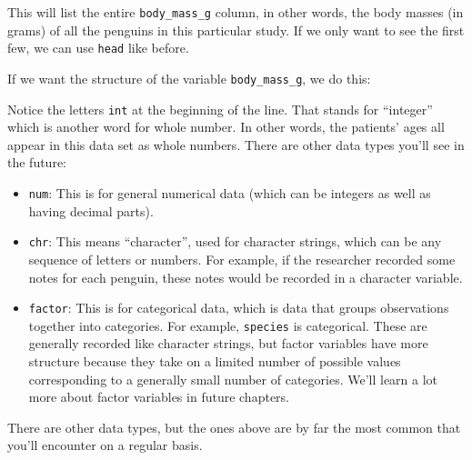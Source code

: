 \documentclass[
]{book}
\newenvironment{Shaded}{\begin{snugshade}}{\end{snugshade}}
\newcommand{\FunctionTok}[1]{\textcolor[rgb]{0.00,0.00,0.00}{#1}}
\newcommand{\NormalTok}[1]{#1}
\newcommand{\SpecialCharTok}[1]{\textcolor[rgb]{0.00,0.00,0.00}{#1}}
\providecommand{\tightlist}{%
  \setlength{\itemsep}{0pt}\setlength{\parskip}{0pt}}
\begin{document}
This will list the entire \texttt{body\_mass\_g} column, in other words, the body masses (in grams) of all the penguins in this particular study. If we only want to see the first few, we can use \texttt{head} like before.

\begin{Shaded}
\end{Shaded}

If we want the structure of the variable \texttt{body\_mass\_g}, we do this:

\begin{Shaded}
\end{Shaded}

Notice the letters \texttt{int} at the beginning of the line. That stands for ``integer'' which is another word for whole number. In other words, the patients' ages all appear in this data set as whole numbers. There are other data types you'll see in the future:

\begin{itemize}
\tightlist
\item
  \texttt{num}: This is for general numerical data (which can be integers as well as having decimal parts).
\item
  \texttt{chr}: This means ``character'', used for character strings, which can be any sequence of letters or numbers. For example, if the researcher recorded some notes for each penguin, these notes would be recorded in a character variable.
\item
  \texttt{factor}: This is for categorical data, which is data that groups observations together into categories. For example, \texttt{species} is categorical. These are generally recorded like character strings, but factor variables have more structure because they take on a limited number of possible values corresponding to a generally small number of categories. We'll learn a lot more about factor variables in future chapters.
\end{itemize}

There are other data types, but the ones above are by far the most common that you'll encounter on a regular basis.
\end{document}
